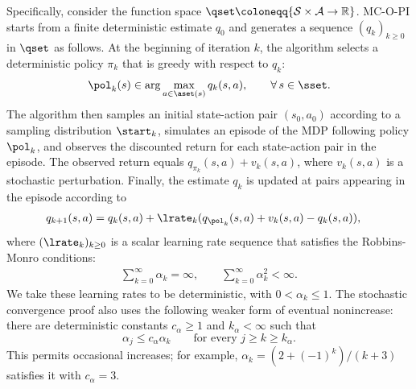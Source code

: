 Specifically, consider the function space $\qset \coloneqq \{ \mathcal S \times \mathcal A \to \mathbb R \}$.
MC-O-PI starts from a finite deterministic estimate $q_0$ and generates a sequence $(q_k)_{k \ge 0}$ in $\qset$ as follows.
At the beginning of iteration $k$, the algorithm selects a deterministic policy $\pi_k$ that is greedy with respect to $q_k$:
\begin{align}
\label{eq: greedy policy definition}
    \pol_k(s) \in \arg\max_{a \in \aset(s)} q_k(s,a),
    \qquad \forall \, s \in \sset .
\end{align}
The algorithm then samples an initial state-action pair $(s_0, a_0)$ according to a sampling distribution $\start_k$,
simulates an episode of the MDP following policy $\pol_k$, and observes the discounted return for each state-action pair in the episode.
The observed return equals $q_{\pi_k}(s,a) + v_k(s,a)$, where $v_k(s,a)$ is a stochastic perturbation.
Finally, the estimate $q_k$ is updated at pairs appearing in the episode
according to
\begin{align}
\label{eq: MC eval update}
    q_{k+1}(s, a) 
    &= q_k(s,a) +  \lrate_k( q_{\pol_k}(s, a) + v_k(s, a) - q_k(s,a) ) ,
\end{align}
where $(\lrate_k)_{k \ge 0}$ is a scalar learning rate sequence that satisfies the Robbins-Monro conditions:
\begin{align}
 \label{eq: robbins monro conditions}
    \sum_{k =0}^\infty \alpha_k = \infty , 
    \qquad
    \sum_{k =0}^\infty \alpha_k^2 < \infty .
\end{align}
We take these learning rates to be deterministic, with $0<\alpha_k\le1$. The stochastic convergence proof also uses the following weaker form of eventual nonincrease: there are deterministic constants $c_\alpha\ge1$ and $k_\alpha<\infty$ such that
\begin{equation}
\label{eq:comparison}
\alpha_j\le c_\alpha\alpha_k\qquad\text{for every }j\ge k\ge k_\alpha.
\end{equation}
This permits occasional increases; for example, $\alpha_k=(2+(-1)^k)/(k+3)$ satisfies it with $c_\alpha=3$.



